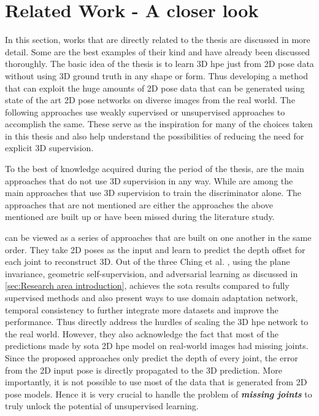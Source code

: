 
\section{Related Work - A closer look}
\label{sec:Related Work}

In this section, works that are directly related to the thesis are discussed in more detail. Some are the best examples of their kind and have already been discussed thoroughly. The basic idea of the thesis is to learn 3D \ac{hpe} just from 2D pose data without using 3D ground truth in any shape or form. Thus developing a method that can exploit the huge amounts of 2D pose data that can be generated using state of the art 2D pose networks on diverse images from the real world. The following approaches use weakly supervised or unsupervised approaches to accomplish the same. These serve as the inspiration for many of the choices taken in this thesis and also help understand the possibilities of reducing the need for explicit 3D supervision.

To the best of knowledge acquired during the period of the thesis, \cite{can3dpose, amazon1, unsupervisedAdversarial, c3dpo} are the main approaches that do not use 3D supervision in any way. While \cite{repnet, weaklymultiple} are among the main approaches that use 3D supervision to train the discriminator alone. The approaches that are not mentioned are either the approaches the above mentioned are built up or have been missed during the literature study.

\cite{unsupervisedAdversarial, can3dpose, amazon1} can be viewed as a series of approaches that are built on one another in the same order. They take 2D poses as the input and learn to predict the depth offset for each joint to reconstruct 3D. Out of the three Ching et al. \cite{amazon1}, using the plane invariance, geometric self-supervision, and adversarial learning as discussed in \ref{sec:Research area introduction}, achieves the \ac{sota} results compared to fully supervised methods and also present ways to use domain adaptation network, temporal consistency to further integrate more datasets and improve the performance. Thus directly address the hurdles of scaling the 3D \ac{hpe} network to the real world. However, they also acknowledge the fact that most of the predictions made by \ac{sota} 2D \ac{hpe} model on real-world images had missing joints. Since the proposed approaches only predict the depth of every joint, the error from the 2D input pose is directly propagated to the 3D prediction. More importantly, it is not possible to use most of the data that is generated from 2D pose models. Hence it is very crucial to handle the problem of \textit{\textbf{missing joints}} to truly unlock the potential of unsupervised learning.

